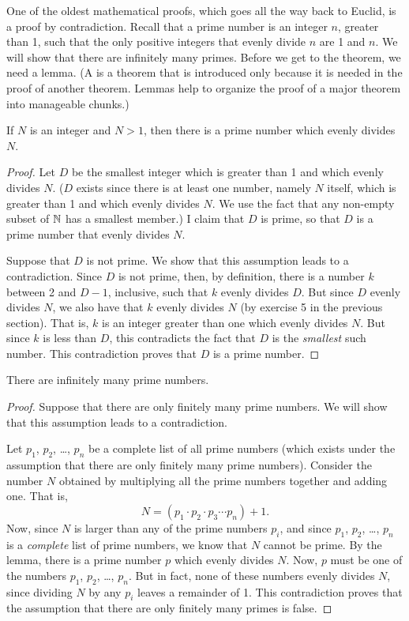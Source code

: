 \medbreak

One of the oldest mathematical proofs, which goes all the
way back to Euclid, is a proof by contradiction.
Recall that a prime number is an integer $n$, greater than 1, 
such that the only positive integers that evenly divide $n$ are
1 and $n$.  We will show that there are infinitely many primes.
Before we get to the theorem, we need a lemma.
(A  is a theorem that is introduced only because it
is needed in the proof of another theorem.  Lemmas help to
organize the proof of a major theorem into manageable chunks.)

\begin{lemma}\label{helpful}
If $N$ is an integer and $N>1$, then there is a prime number
which evenly divides $N$.
\end{lemma}
\begin{proof}
Let $D$ be the smallest integer which is greater than 1 and
which evenly divides $N$.  ($D$ exists since there is at least one
number, namely $N$ itself, which is greater than 1 and which
evenly divides $N$.  We use the fact that any non-empty subset
of ${\mathbb N}$ has a smallest member.)  I claim that $D$ is prime, so that
$D$ is a prime number that evenly divides $N$.

Suppose that $D$ is not prime.  We show that this assumption
leads to a contradiction.  Since $D$ is not prime, then, by definition,
there is a number $k$ between 2 and $D-1$, inclusive, such that
$k$ evenly divides $D$.  But since $D$ evenly divides $N$, we also
have that $k$ evenly divides $N$ (by exercise 5 in the previous section).  That is, $k$ is an integer
greater than one which evenly divides $N$.  But since $k$ is
less than $D$, this contradicts the fact that $D$ is the \emph{smallest}
such number.  This contradiction proves that $D$ is a prime number.
\end{proof}

\begin{theorem}
There are infinitely many prime numbers.
\end{theorem}
\begin{proof}
Suppose that there are only finitely many prime numbers.  We will
show that this assumption leads to a contradiction.

Let $p_1$, $p_2$, \dots, $p_n$ be a complete list of all prime numbers
(which exists under the assumption that there are only finitely many
prime numbers).  Consider the number $N$ obtained by multiplying
all the prime numbers together and adding one.  That is,
\[N=(p_1\cdot p_2\cdot p_3\cdots p_n) + 1.\]
Now, since $N$ is larger than any of the prime numbers $p_i$, and
since $p_1$, $p_2$, \dots, $p_n$ is a \emph{complete} list of prime numbers,
we know that $N$ cannot be prime.  By the lemma, there is a prime
number $p$ which evenly divides $N$.  Now, $p$ must be one of the
numbers $p_1$, $p_2$, \dots, $p_n$.  But in fact, none of these numbers evenly
divides $N$, since dividing $N$ by any $p_i$ leaves a remainder of 1.
This contradiction proves that the assumption that there are only
finitely many primes is false.
\end{proof}

